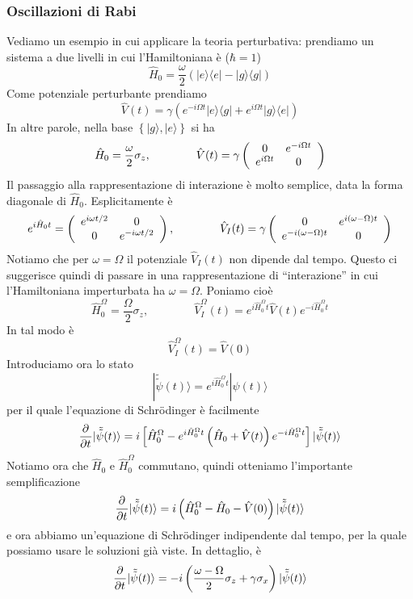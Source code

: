 \documentclass[a4paper, 11pt]{article}
\newcommand{\op}[1]{\hat{#1}}
\renewcommand{\op}[1]{\hat{#1}}
\newcommand{\ham}{\hat{H}}
\renewcommand{\ket}[1]{| #1\rangle}
\renewcommand{\bra}[1]{\langle #1|}
\begin{document}
\subsubsection{Oscillazioni di Rabi}
Vediamo un esempio in cui applicare la teoria perturbativa: prendiamo un sistema a due livelli in cui l'Hamiltoniana è ($\hbar=1$)
\[\ham_0=\frac{\omega}{2}\left(\ket{e}\bra e-\ket g\bra g\right)\]
Come potenziale perturbante prendiamo
\[\op V(t)=\gamma\left(e^{-i\Omega t}\ket e\bra g+e^{i\Omega t}\ket g\bra e\right)\]
In altre parole, nella base $\left\{\ket g,\ket e\right\}$ si ha
\[\ham_0=\frac{\omega}{2}\sigma_z,\qquad\qquad\op V(t)=\gamma\left(\begin{array}{c c}
0&e^{-i\Omega t}\\e^{i\Omega t}&0
\end{array}\right)\]
Il passaggio alla rappresentazione di interazione è molto semplice, data la forma diagonale di $\ham_0$. Esplicitamente è
\[e^{i\ham_0t}=\left(\begin{array}{c c}
e^{i\omega t/2}&0\\0&e^{-i\omega t/2}
\end{array}\right),\qquad\qquad\op V_I(t)=\gamma\left(\begin{array}{c c}
0&e^{i(\omega-\Omega)t}\\e^{-i(\omega-\Omega)t}&0
\end{array}\right)\]
Notiamo che per $\omega=\Omega$ il potenziale $\op V_I(t)$ non dipende dal tempo. Questo ci suggerisce quindi di passare in una rappresentazione di ``interazione'' in cui l'Hamiltoniana imperturbata ha $\omega=\Omega$. Poniamo cioè
\[\ham_0^\Omega=\frac{\Omega}{2}\sigma_z,\qquad\qquad\op V_I^\Omega(t)=e^{i\ham_0^\Omega t}\op V(t)e^{-i\ham_0^\Omega t}\]
In tal modo è
\[\op V^\Omega_I(t)=\op V(0)\]
Introduciamo ora lo stato
\[\ket{\tilde{\tilde{\psi}}(t)}=e^{i\ham_0^\Omega t}\ket{\psi(t)}\]
per il quale l'equazione di Schr\"odinger è facilmente
\[\pder{}{t}\ket{\tilde{\tilde{\psi}}(t)}=i\left[\ham_0^\Omega-e^{i\ham_0^\Omega t}\left(\ham_0+\op V(t)\right)e^{-i\ham_0^\Omega t}\right]\ket{\tilde{\tilde{\psi}}(t)}\]
Notiamo ora che $\ham_0$ e $\ham_0^\Omega$ commutano, quindi otteniamo l'importante semplificazione
\[\pder{}{t}\ket{\tilde{\tilde{\psi}}(t)}=i\left(\ham_0^\Omega-\ham_0-\op V(0)\right)\ket{\tilde{\tilde{\psi}}(t)}\]
e ora abbiamo un'equazione di Schr\"odinger indipendente dal tempo, per la quale possiamo usare le soluzioni già viste. In dettaglio, è
\[\pder{}{t}\ket{\tilde{\tilde{\psi}}(t)}=-i\left(\frac{\omega-\Omega}{2}\sigma_z+\gamma\sigma_x\right)\ket{\tilde{\tilde{\psi}}(t)}\]
\end{document}

